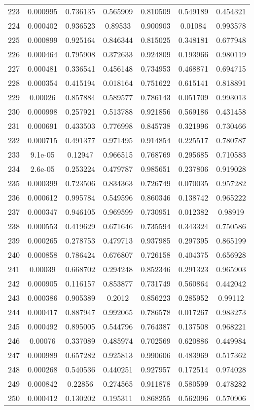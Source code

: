 \begin{table}
\begin{tabular}{c|c|c|c|c|c|c}
223 & 0.000995 & 0.736135 & 0.565909 & 0.810509 & 0.549189 & 0.454321\\
224 & 0.000402 & 0.936523 & 0.89533 & 0.900903 & 0.01084 & 0.993578\\
225 & 0.000899 & 0.925164 & 0.846344 & 0.815025 & 0.348181 & 0.677948\\
226 & 0.000464 & 0.795908 & 0.372633 & 0.924809 & 0.193966 & 0.980119\\
227 & 0.000481 & 0.336541 & 0.456148 & 0.734953 & 0.468871 & 0.694715\\
228 & 0.000354 & 0.415194 & 0.018164 & 0.751622 & 0.615141 & 0.818891\\
229 & 0.00026 & 0.857884 & 0.589577 & 0.786143 & 0.051709 & 0.993013\\
230 & 0.000998 & 0.257921 & 0.513788 & 0.921856 & 0.569186 & 0.431458\\
231 & 0.000691 & 0.433503 & 0.776998 & 0.845738 & 0.321996 & 0.730466\\
232 & 0.000715 & 0.491377 & 0.971495 & 0.914854 & 0.225517 & 0.780787\\
233 & 9.1e-05 & 0.12947 & 0.966515 & 0.768769 & 0.295685 & 0.710583\\
234 & 2.6e-05 & 0.253224 & 0.479787 & 0.985651 & 0.237806 & 0.919028\\
235 & 0.000399 & 0.723506 & 0.834363 & 0.726749 & 0.070035 & 0.957282\\
236 & 0.000612 & 0.995784 & 0.549596 & 0.860346 & 0.138742 & 0.965222\\
237 & 0.000347 & 0.946105 & 0.969599 & 0.730951 & 0.012382 & 0.98919\\
238 & 0.000553 & 0.419629 & 0.671646 & 0.735594 & 0.343324 & 0.750586\\
239 & 0.000265 & 0.278753 & 0.479713 & 0.937985 & 0.297395 & 0.865199\\
240 & 0.000858 & 0.786424 & 0.676807 & 0.726158 & 0.404375 & 0.656928\\
241 & 0.00039 & 0.668702 & 0.294248 & 0.852346 & 0.291323 & 0.965903\\
242 & 0.000905 & 0.116157 & 0.853877 & 0.731749 & 0.560864 & 0.442042\\
243 & 0.000386 & 0.905389 & 0.2012 & 0.856223 & 0.285952 & 0.99112\\
244 & 0.000417 & 0.887947 & 0.992065 & 0.786578 & 0.017267 & 0.983273\\
245 & 0.000492 & 0.895005 & 0.544796 & 0.764387 & 0.137508 & 0.968221\\
246 & 0.00076 & 0.337089 & 0.485974 & 0.702569 & 0.620886 & 0.449984\\
247 & 0.000989 & 0.657282 & 0.925813 & 0.990606 & 0.483969 & 0.517362\\
248 & 0.000268 & 0.540536 & 0.440251 & 0.927957 & 0.172514 & 0.974028\\
249 & 0.000842 & 0.22856 & 0.274565 & 0.911878 & 0.580599 & 0.478282\\
250 & 0.000412 & 0.130202 & 0.195311 & 0.868255 & 0.562096 & 0.570906\\
\end{tabular}
\end{table}
